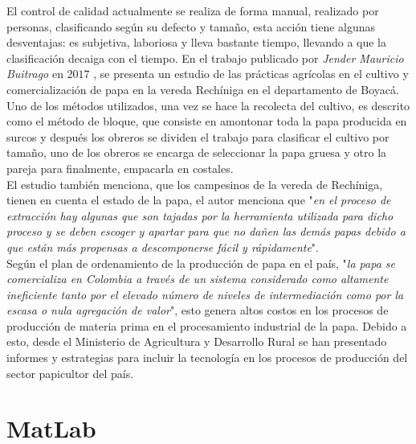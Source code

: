 El control de calidad actualmente se realiza de forma manual, realizado por personas, clasificando según su defecto y tamaño, esta acción tiene algunas desventajas: es subjetiva, laboriosa y lleva bastante tiempo, llevando a que la clasificación decaiga con el tiempo. En el trabajo publicado por \textit{Jender Mauricio Buitrago} en $2017$ \cite{recoleccionpapa}, se presenta un estudio de las prácticas agrícolas en el cultivo y comercialización de papa en la vereda Rechíniga en el departamento de Boyacá. Uno de los métodos utilizados, una vez se hace la recolecta del cultivo, es descrito como el método de bloque, que consiste en amontonar toda la papa producida en surcos y después los obreros se dividen el trabajo para clasificar el cultivo por tamaño, uno de los obreros se encarga de seleccionar la papa gruesa y otro la pareja para finalmente, empacarla en costales.\\

El estudio también menciona, que los campesinos de la vereda de Rechíniga, tienen en cuenta  el estado de la papa, el autor menciona que "\textit{en el proceso de extracción hay algunas que son tajadas por la herramienta utilizada para dicho proceso y se deben escoger y apartar para que no dañen las demás papas debido a que están más propensas a descomponerse fácil y rápidamente}".\\

Según el plan de ordenamiento de la producción de papa en el país, "\textit{la  papa  se  comercializa  en  Colombia  a  través  de  un  sistema  considerado  como altamente ineficiente tanto por el elevado número de niveles de intermediación como por la escasa o nula agregación de valor}", esto genera altos costos en los procesos de producción de materia prima en el procesamiento industrial de la papa. Debido a esto, desde el Ministerio de Agricultura y Desarrollo Rural se han presentado informes y estrategias para incluir la tecnología en los procesos de producción del sector papicultor del país.  

\section{MatLab}

